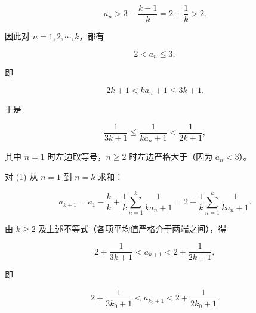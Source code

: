 \begin{answer}
\nopagebreak[4]
\[
a_{n}>3-\frac{k-1}{k}=2+\frac{1}{k}>2.
\]

因此对 $n=1,2,\cdots,k$，都有

\nopagebreak[4]
\[
2<a_{n}\le 3,
\]

即

\nopagebreak[4]
\[
2k+1<ka_{n}+1\le 3k+1.
\]

于是

\nopagebreak[4]
\[
\frac{1}{3k+1}\le\frac{1}{ka_{n}+1}<\frac{1}{2k+1},
\]

其中 $n=1$ 时左边取等号，$n\ge 2$ 时左边严格大于（因为 $a_{n}<3$）。

对 (1) 从 $n=1$ 到 $n=k$ 求和：

\nopagebreak[4]
\[
a_{k+1}=a_{1}-\frac{k}{k}+\frac{1}{k}\sum_{n=1}^{k}\frac{1}{ka_{n}+1}
=2+\frac{1}{k}\sum_{n=1}^{k}\frac{1}{ka_{n}+1}. \tag{2}
\]

由 $k\ge 2$ 及上述不等式（各项平均值严格介于两端之间），得

\nopagebreak[4]
\[
2+\frac{1}{3k+1}<a_{k+1}<2+\frac{1}{2k+1},
\]

即

\nopagebreak[4]
\[
2+\frac{1}{3k_{0}+1}<a_{k_{0}+1}<2+\frac{1}{2k_{0}+1}.
\]



\end{answer}
